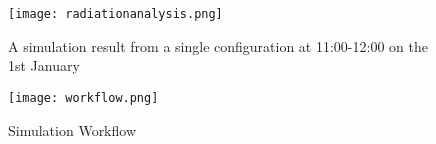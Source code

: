 

\begin{figure}
\begin{center}
\texttt{[image: radiationanalysis.png]}
\caption{A simulation result from a single configuration at 11:00-12:00 on the 1st January}
\label{fig:radiation}
\end{center}
\end{figure}


\begin{figure}
\begin{center}
\texttt{[image: workflow.png]}
\caption{Simulation Workflow}
\label{fig:workflow}
\end{center}
\end{figure}